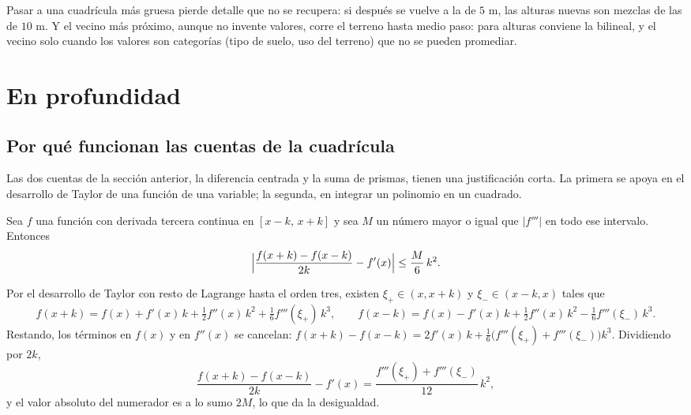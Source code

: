 \begin{atencion}
Pasar a una cuadrícula más gruesa pierde detalle que no se recupera: si después se vuelve a la
de \(5\) m, las alturas nuevas son mezclas de las de \(10\) m. Y el vecino más próximo, aunque no
invente valores, corre el terreno hasta medio paso: para alturas conviene la bilineal, y el
vecino solo cuando los valores son categorías (tipo de suelo, uso del terreno) que no se pueden
promediar.
\end{atencion}

\section{En profundidad}

\subsection{Por qué funcionan las cuentas de la cuadrícula}\label{sec:terreno-demostraciones}

Las dos cuentas de la sección anterior, la diferencia centrada y la suma de prismas, tienen una
justificación corta. La primera se apoya en el desarrollo de Taylor de una función de una
variable; la segunda, en integrar un polinomio en un cuadrado.

\begin{proposicion}\label{prop:terreno-centrada}
Sea \(f\) una función con derivada tercera continua en \([x-k,\,x+k]\) y sea \(M\) un número mayor o igual
que \(\lvert f'''\rvert\) en todo ese intervalo. Entonces
\[
  \Bigl\lvert\frac{f(x+k)-f(x-k)}{2k}-f'(x)\Bigr\rvert\le\frac{M}{6}\,k^2 .
\]
\end{proposicion}

\begin{demostracion}
Por el desarrollo de Taylor con resto de Lagrange hasta el orden tres, existen \(\xi_+\in(x,x+k)\)
y \(\xi_-\in(x-k,x)\) tales que
\[
  f(x+k)=f(x)+f'(x)\,k+\tfrac12f''(x)\,k^2+\tfrac16f'''(\xi_+)\,k^3,\qquad
  f(x-k)=f(x)-f'(x)\,k+\tfrac12f''(x)\,k^2-\tfrac16f'''(\xi_-)\,k^3 .
\]
Restando, los términos en \(f(x)\) y en \(f''(x)\) se cancelan:
\(f(x+k)-f(x-k)=2f'(x)\,k+\tfrac16\bigl(f'''(\xi_+)+f'''(\xi_-)\bigr)k^3\). Dividiendo por \(2k\),
\[
  \frac{f(x+k)-f(x-k)}{2k}-f'(x)=\frac{f'''(\xi_+)+f'''(\xi_-)}{12}\,k^2 ,
\]
y el valor absoluto del numerador es a lo sumo \(2M\), lo que da la desigualdad.
\end{demostracion}

